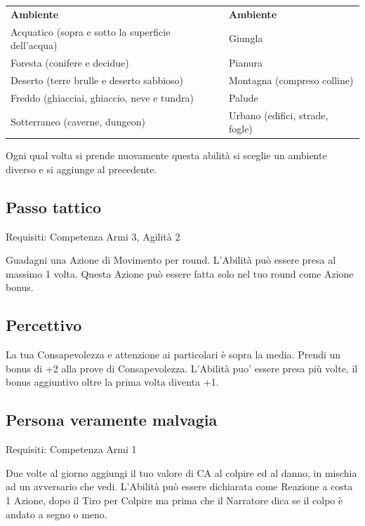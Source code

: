 \documentclass[a4paper,11pt,twoside,openany]{book}
\begin{document}
\begin{tabular}{ll}
	\toprule
	\textbf{Ambiente}                                  & \textbf{Ambiente}\\
	Acquatico (sopra e sotto la superficie dell'acqua) & Giungla\\
	Foresta (conifere e decidue)                       & Pianura\\
	Deserto (terre brulle e deserto sabbioso)          & Montagna (compreso colline)\\
	Freddo (ghiacciai, ghiaccio, neve e tundra)        & Palude\\
	Sotterraneo (caverne, dungeon)                     & Urbano (edifici, strade, fogle)\\
\end{tabular}

\bigskip

Ogni qual volta si prende nuovamente questa abilità si sceglie un ambiente diverso e si aggiunge al precedente.

\subsection{Passo tattico}

Requisiti: Competenza Armi 3, Agilità 2

Guadagni una Azione di Movimento per round. L'Abilità può essere presa al massimo 1 volta. Questa Azione può essere fatta solo nel tuo round come Azione bonus.

\subsection{Percettivo}

La tua Consapevolezza e attenzione ai particolari è sopra la media.
Prendi un bonus di +2 alla prove di Consapevolezza. L'Abilità puo' essere presa più volte, il bonus aggiuntivo oltre la prima volta diventa +1.

\subsection{Persona veramente malvagia}

Requisiti: Competenza Armi 1

Due volte al giorno aggiungi il tuo valore di CA al colpire ed al danno, in mischia ad un avversario che vedi. L'Abilità può essere dichiarata come Reazione a costa 1 Azione, dopo il Tiro per Colpire ma prima che il Narratore dica se il colpo è andato a segno o meno.
\end{document}
